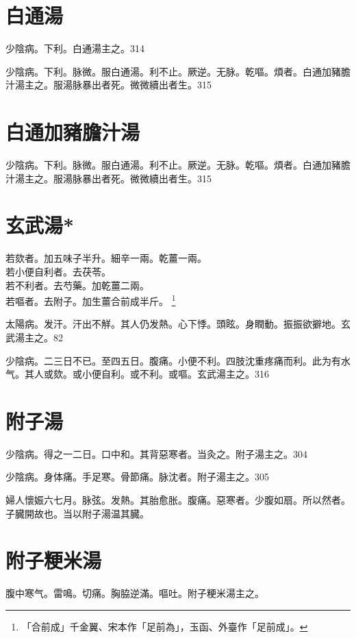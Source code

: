\documentclass[12pt,twoside,UTF8,b5paper]{ctexbook}
\begin{document}
\section{白通湯}

少陰病。下利。白通湯主之。314

少陰病。下利。脉微。服白通湯。利不止。厥逆。无脉。乾嘔。煩者。白通加豬膽汁湯主之。服湯脉暴出者死。微{微}續{出}者生。315

\section{白通加豬膽汁湯}

少陰病。下利。脉微。服白通湯。利不止。厥逆。无脉。乾嘔。煩者。白通加豬膽汁湯主之。服湯脉暴出者死。微{微}續{出}者生。315

\section{玄武湯*}

若欬者。加五味子半升。細辛一兩。乾薑一兩。\\
若小便自利者。去茯苓。\\
若不利者。去芍藥。加乾薑二兩。\\
若嘔者。去附子。加生薑合前成半斤。
	\footnote{「合前成」千金翼、宋本作「足前為」，玉函、外臺作「足前成」。}

太陽病。发汗。汗出不觧。其人仍发熱。心下悸。頭眩。身瞤動。振振欲擗地。玄武湯主之。82

少陰病。二三日不已。至四五日。腹痛。小便不利。四肢沈重疼痛而利。此为有水气。其人或欬。或小便{自}利。或不利。或嘔。玄武湯主之。316

\section{附子湯}

少陰病。得之一二日。口中和。其背惡寒者。当灸之。附子湯主之。304

少陰病。身体痛。手足寒。骨節痛。脉沈者。附子湯主之。305

婦人懷娠六七月。脉弦。发熱。其胎愈胀。腹痛。惡寒者。少腹如扇。所以然者。子臓開故也。当以附子湯温其臓。

\section{附子粳米湯}

腹中寒气。雷鳴。切痛。胸脇逆滿。嘔吐。附子粳米湯主之。
\end{document}
